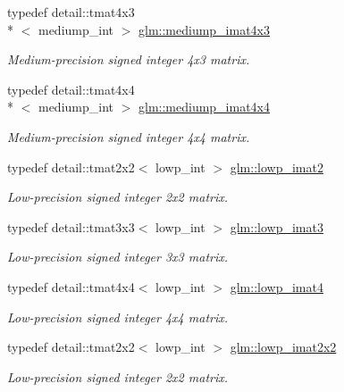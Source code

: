 \begin{DoxyCompactItemize}
typedef detail\-::tmat4x3\\*
$<$ mediump\-\_\-int $>$ \hyperlink{group__gtc__matrix__integer_ga689c74a65fc4118f1fe57b6cf953748b}{glm\-::mediump\-\_\-imat4x3}
\begin{DoxyCompactList}\small\item\em Medium-\/precision signed integer 4x3 matrix. \end{DoxyCompactList}\item 
typedef detail\-::tmat4x4\\*
$<$ mediump\-\_\-int $>$ \hyperlink{group__gtc__matrix__integer_gaced73f9aecd6626cdfef5bfb3648b750}{glm\-::mediump\-\_\-imat4x4}
\begin{DoxyCompactList}\small\item\em Medium-\/precision signed integer 4x4 matrix. \end{DoxyCompactList}\item 
typedef detail\-::tmat2x2$<$ lowp\-\_\-int $>$ \hyperlink{group__gtc__matrix__integer_ga70fa8b07f1a12d400d669e4978a6795c}{glm\-::lowp\-\_\-imat2}
\begin{DoxyCompactList}\small\item\em Low-\/precision signed integer 2x2 matrix. \end{DoxyCompactList}\item 
typedef detail\-::tmat3x3$<$ lowp\-\_\-int $>$ \hyperlink{group__gtc__matrix__integer_ga5ce884d9735040424846bc45671b446a}{glm\-::lowp\-\_\-imat3}
\begin{DoxyCompactList}\small\item\em Low-\/precision signed integer 3x3 matrix. \end{DoxyCompactList}\item 
typedef detail\-::tmat4x4$<$ lowp\-\_\-int $>$ \hyperlink{group__gtc__matrix__integer_ga644e005864dce94a642fcfe939538deb}{glm\-::lowp\-\_\-imat4}
\begin{DoxyCompactList}\small\item\em Low-\/precision signed integer 4x4 matrix. \end{DoxyCompactList}\item 
typedef detail\-::tmat2x2$<$ lowp\-\_\-int $>$ \hyperlink{group__gtc__matrix__integer_gaaf7a95922fb146929cb174eea1cac2a8}{glm\-::lowp\-\_\-imat2x2}
\begin{DoxyCompactList}\small\item\em Low-\/precision signed integer 2x2 matrix. \end{DoxyCompactList}\item 

\end{DoxyCompactItemize}

